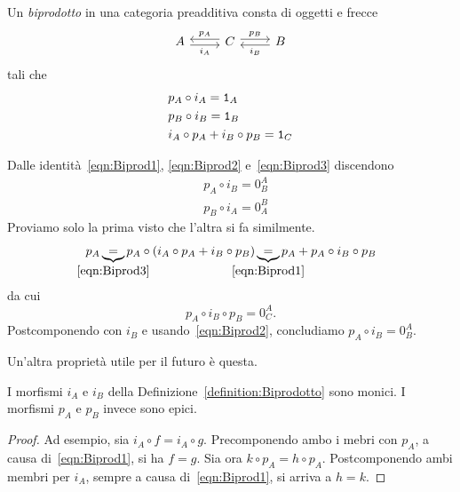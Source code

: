 \begin{definition}\label{definition:Biprodotto}
  Un {\em biprodotto} in una categoria preadditiva consta di oggetti e
  frecce
  \[
    \begin{tikzcd}
      A \ar["{i_A}", r, shift right, swap] & C \ar["{p_A}", l, shift
      right, swap] \ar["{p_B}", r, shift left] & B \ar["{i_B}", l, shift
      left]
    \end{tikzcd}
  \]
  tali che
  \begin{align}
    & p_A \circ i_A = \mathtt 1_A \label{eqn:Biprod1} \\
    & p_B \circ i_B = \mathtt 1_B \label{eqn:Biprod2}\\
    & i_A \circ p_A + i_B \circ p_B = \mathtt 1_C \label{eqn:Biprod3}
  \end{align}
\end{definition}

\begin{remark}
  Dalle identità~\ref{eqn:Biprod1}, \ref{eqn:Biprod2}
  e~\ref{eqn:Biprod3} discendono
  \begin{align}
    & p_A \circ i_B = 0_B^A \label{eqn:Biprod4} \\
    & p_B \circ i_A = 0_A^B \label{eqn:Biprod5}
  \end{align}
  Proviamo solo la prima visto che l'altra si fa similmente.
  \[
    p_A \underbrace{=}_{\mathclap{\eqref{eqn:Biprod3}}} p_A \circ \left(
      i_A \circ p_A + i_B \circ p_B \right)
    \underbrace{=}_{\mathclap{\eqref{eqn:Biprod1}}} p_A + p_A \circ i_B
    \circ p_B
  \]
  da cui
  \[
    p_A \circ i_B \circ p_B = 0_C^A .
  \]
  Postcomponendo con \(i_B\) e usando~\eqref{eqn:Biprod2}, concludiamo
  \(p_A \circ i_B = 0_B^A\).
\end{remark}

Un'altra proprietà utile per il futuro è questa.

\begin{proposition}
  I morfismi \(i_A\) e \(i_B\) della
  Definizione~\ref{definition:Biprodotto} sono monici. I morfismi
  \(p_A\) e \(p_B\) invece sono epici.
\end{proposition}

\begin{proof}
  Ad esempio, sia \(i_A \circ f = i_A \circ g\). Precomponendo ambo i
  mebri con \(p_A\), a causa di~\eqref{eqn:Biprod1}, si ha \(f =
  g\). Sia ora \(k \circ p_A = h \circ p_A\). Postcomponendo ambi membri
  per \(i_A\), sempre a causa di~\eqref{eqn:Biprod1}, si arriva a
  \(h = k\).
\end{proof}

